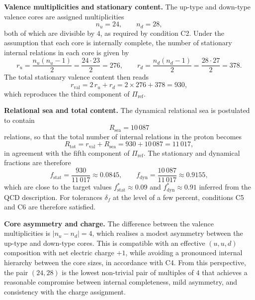 \documentclass[11pt,a4paper]{article}
\begin{document}
\medskip
\noindent\textbf{Valence multiplicities and stationary content.} The up-type and down-type valence cores are assigned multiplicities
\begin{equation}
n_u = 24,\qquad n_d = 28,
\end{equation}
both of which are divisible by $4$, as required by condition C2. Under the assumption that each core is internally complete, the number of stationary internal relations in each core is given by
\begin{equation}
r_u = \frac{n_u(n_u-1)}{2} = \frac{24\cdot 23}{2} = 276,\qquad r_d = \frac{n_d(n_d-1)}{2} = \frac{28\cdot 27}{2} = 378.
\end{equation}
The total stationary valence content then reads
\begin{equation}
r_{\mathrm{val}} = 2\,r_u + r_d = 2\times 276 + 378 = 930,
\end{equation}
which reproduces the third component of $\Pi_{\mathrm{ref}}$.\cite{LaubscherPDLFull2026,LaubscherLDP2026}

\medskip
\noindent\textbf{Relational sea and total content.} The dynamical relational sea is postulated to contain
\begin{equation}
R_{\mathrm{sea}} = 10\,087
\end{equation}
relations, so that the total number of internal relations in the proton becomes
\begin{equation}
R_{\mathrm{tot}} = r_{\mathrm{val}} + R_{\mathrm{sea}} = 930 + 10\,087 = 11\,017,
\end{equation}
in agreement with the fifth component of $\Pi_{\mathrm{ref}}$.\cite{LaubscherPDLFull2026,LaubscherIMRadPDL2026} The stationary and dynamical fractions are therefore
\begin{equation}
f_{\mathrm{stat}} = \frac{930}{11\,017} \approx 0.0845,\qquad f_{\mathrm{dyn}} = \frac{10\,087}{11\,017} \approx 0.9155,
\end{equation}
which are close to the target values $f_{\mathrm{stat}}^{\ast}\approx 0.09$ and $f_{\mathrm{dyn}}^{\ast}\approx 0.91$ inferred from the QCD description.\cite{AmslerQCDProton,LaubscherIMRadPDL2026} For tolerances $\delta_f$ at the level of a few percent, conditions C5 and C6 are therefore satisfied.

\medskip
\noindent\textbf{Core asymmetry and charge.} The difference between the valence multiplicities is $|n_u-n_d|=4$, which realises a modest asymmetry between the up-type and down-type cores. This is compatible with an effective $(u,u,d)$ composition with net electric charge $+1$, while avoiding a pronounced internal hierarchy between the core sizes, in accordance with C4.\cite{LaubscherLDP2026} From this perspective, the pair $(24,28)$ is the lowest non-trivial pair of multiples of $4$ that achieves a reasonable compromise between internal completeness, mild asymmetry, and consistency with the charge assignment.
\end{document}
